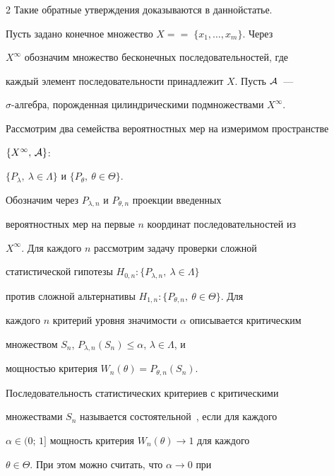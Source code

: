 \begin{multicols}{2}
Такие обратные утверждения доказываются в данной\linebreak статье.


    





    Пусть задано конечное множество  $X =$\linebreak $=\;\{x_1,\ldots,x_m\}$. Через 


$X^\infty$ обозначим множество бесконечных последовательностей, где 


каж\-дый элемент последовательности принадлежит $X$. Пусть $\cal{A}$~--- 


$\sigma$-алгебра, порожденная цилиндрическими подмножествами $X^\infty$. 


Рассмотрим два семейства вероятностных мер на измеримом пространстве 


$\{X^\infty,\,\cal{A}\}$:


    $\{P_\lambda ,\ \lambda\in \Lambda\}$ и $\{P_\theta , \ \theta\in \Theta\}$.








    Обозначим через $P_{\lambda,n}$ и $P_{\theta,n}$ проекции введенных 


вероятностных мер на первые $n$ координат последовательностей из 


$X^\infty$. Для  каждого $n$ рассмотрим задачу проверки сложной 


статистической гипотезы $H_{0,n}:  \{P_{\lambda,n}, \ \lambda\in \Lambda\}$ 


против сложной альтернативы $H_{1,n}: \{P_{\theta,n},\ \theta\in\Theta\}$.  Для 


каждого $n$ критерий уровня значимости $\alpha$ описывается критическим 


множеством $S_n$, $P_{\lambda,n}(S_n)\leq \alpha$, $\lambda\in\Lambda$, и 


мощностью критерия $W_n(\theta ) =P_{\theta, n}(S_n)$.


    


    Последовательность статистических критериев с критическими 


множествами $S_n$ называется состоятельной~\cite{3gr}, если для каждого 


$\alpha \in (0;\,1]$ мощность критерия $W_n(\theta )\rightarrow 1$ для каждого 


$\theta\in\Theta$. При этом можно считать, что $\alpha\rightarrow 0$ при 



\end{multicols}
